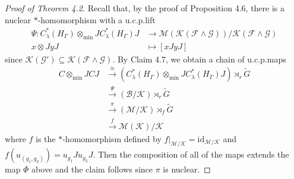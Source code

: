 \documentclass{amsart}
\theoremstyle{definition}
\renewcommand{\subset}{\subseteq}
\newcommand{\longto}{\longrightarrow}
\newcommand{\mintensor}{\otimes_{\mathrm{min}}}
\begin{document}
\begin{proof}[Proof of Theorem 4.2]
Recall that, by the proof of Proposition 4.6, there is a nuclear $\ast$-homomorphism with a u.c.p.\@ lift
\begin{align}
\Psi : C^{\ast}_{\lambda}(H_{\Gamma})\mintensor
JC^{\ast}_{\lambda}(H_{\Gamma})J &\longto \mathcal{M}(\mathcal{K}(\mathcal{F}\wedge\mathcal{G}))/\mathcal{K}(\mathcal{F}\wedge\mathcal{G}) \\
x\otimes JyJ &\longmapsto [xJyJ]
\end{align}
since $\mathcal{K}(\mathcal{G}')\subset\mathcal{K}(\mathcal{F}\wedge\mathcal{G})$. 
By Claim 4.7, we obtain a chain of u.c.p.\@ maps
\begin{align}
C\mintensor JCJ &\xrightarrow{\cong} (C^{\ast}_{\lambda}(H_{\Gamma})\mintensor
JC^{\ast}_{\lambda}(H_{\Gamma})J)\rtimes_r \tilde{G} \\
&\xrightarrow{\Psi} (\mathscr{B}/\mathcal{K})\rtimes_r \tilde{G} \\
&\xrightarrow{\pi} (\mathscr{M}/\mathcal{K})\rtimes_f \tilde{G} \\
&\xrightarrow{f} \mathcal{M}(\mathcal{K})/\mathcal{K}
\end{align}
where $f$ is the $\ast$-homomorphism defined by 
$f\vert_{\mathscr{M}/\mathcal{K}}=\mathrm{id}_{\mathscr{M}/\mathcal{K}}$ 
and $f(u_{(g_1, g_2)})=u_{g_1}Ju_{g_2}J$. Then the composition of all of the maps extends the map $\Phi$ above
and the claim follows since $\pi$ is nuclear. 
\end{proof}
\end{document}
